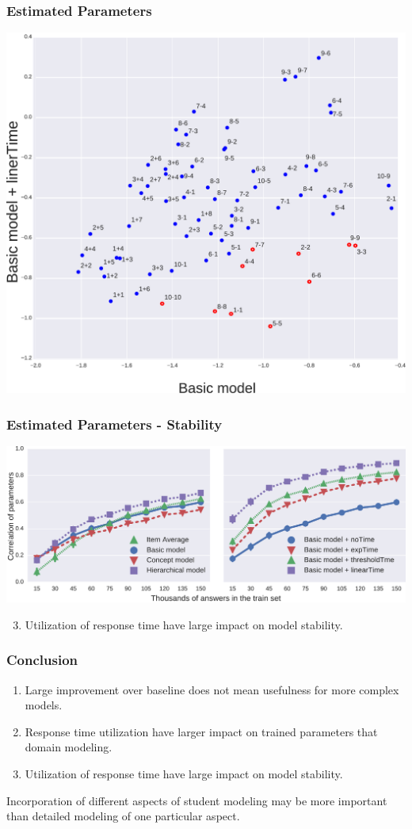 \documentclass[xcolor=svgnames]{beamer}
\begin{document}
\begin{frame}
    \frametitle{Estimated Parameters}
    \includegraphics[width=0.8\linewidth]{figures/difficulties}
\end{frame}
\begin{frame}
    \frametitle{Estimated Parameters - Stability}
    \includegraphics[width=\linewidth]{figures/stability}

    \begin{enumerate}
       \setcounter{enumi}{2}
        \item Utilization of response time have large impact on model stability.
    \end{enumerate}
\end{frame}
\begin{frame}
    \frametitle{Conclusion}
    \begin{enumerate}
        \item Large improvement over baseline does not mean usefulness for more complex models.
        \item Response time utilization have larger impact on trained parameters that domain modeling.
        \item Utilization of response time have large impact on model stability.
    \end{enumerate}
    Incorporation of different aspects of student modeling may be more important than detailed modeling of one particular aspect.
\end{frame}
\end{document}
